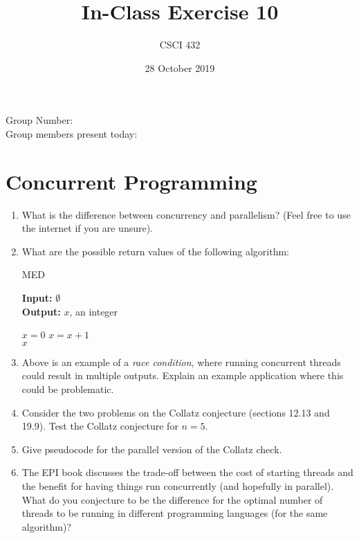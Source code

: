 \documentclass{article}
\title{In-Class Exercise 10}
\author{CSCI 432}
\date{28 October 2019}
\begin{document}
\maketitle

\noindent
Group Number:\\
Group members present today:

\section*{Concurrent Programming}

\begin{enumerate}
    \item What is the difference between concurrency and parallelism? (Feel
        free to use the internet if you are unsure).
        \vspace{1in}


    \item What are the possible return values of the following algorithm:
        \begin{algorithm}\caption{\textsc{MED}}\label{alg:seb}
                {\bf Input:} $\emptyset$\\
                {\bf Output:} $x$, an integer
            \begin{algorithmic}[1]
                \State $x=0$
                \State $x=x+1$
                \EndFor\\
                \Return $x$
            \end{algorithmic}
        \end{algorithm}

    \item Above is an  example of a \emph{race condition},
        where running concurrent
        threads could result in multiple outputs.  Explain an example
        application where this could be problematic.
        \vspace{3in}

    \pagebreak
    \item Consider the two problems on the Collatz conjecture (sections 12.13
        and 19.9).  Test the Collatz conjecture for $n=5$.
        \vspace{1in}

    \item Give pseudocode for the parallel version of the Collatz check.
        \vspace{3in}

    \item The EPI book discusses the trade-off between the cost of starting
        threads and the benefit for having things run concurrently (and
        hopefully in parallel).  What do you conjecture to be the difference for
        the optimal number of threads to be running in different programming
        languages (for the same algorithm)?
\end{enumerate}
\end{document}
